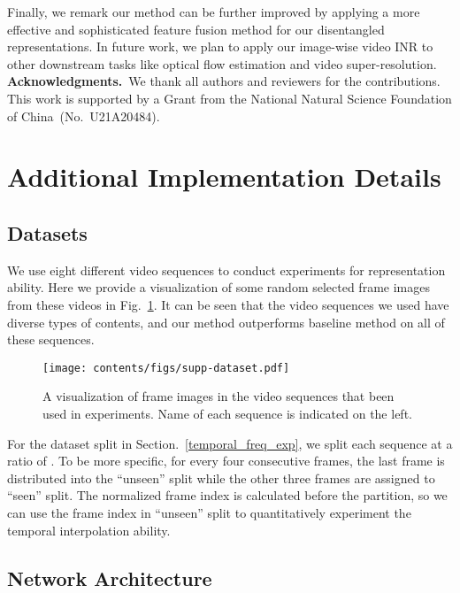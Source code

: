 \documentclass[runningheads]{llncs}
\begin{document}
Finally, we remark our method can be further improved by applying a more effective and sophisticated feature fusion method for our disentangled representations. In future work, we plan to apply our image-wise video INR to other downstream tasks like optical flow estimation and video super-resolution.
~\\

\noindent \textbf{Acknowledgments.}~We thank all authors and reviewers for the contributions. This work is supported by a Grant from the National Natural Science Foundation of China~(No.~U21A20484). 



\clearpage


\clearpage

\appendix
\section{Additional Implementation Details}

\subsection{Datasets}

We use eight different video sequences to conduct experiments for representation ability. Here we provide a visualization of some random selected frame images from these videos in Fig.~\ref{fig:dataset}. It can be seen that the video sequences we used have diverse types of contents, and our method outperforms baseline method on all of these sequences.

\begin{figure}[htbp]
    \centering
    \texttt{[image: contents/figs/supp-dataset.pdf]}
\caption{A visualization of frame images in the video sequences that been used in experiments. Name of each sequence is indicated on the left.}
    \label{fig:dataset}
\end{figure}

For the dataset split in Section.~\ref{temporal_freq_exp}, we split each sequence at a ratio of . To be more specific, for every four consecutive frames, the last frame is distributed into the ``unseen'' split while the other three frames are assigned to ``seen'' split. The normalized frame index is calculated before the partition, so we can use the frame index in ``unseen'' split to quantitatively experiment the temporal interpolation ability.

\subsection{Network Architecture}
\label{supp-arch}
\end{document}
